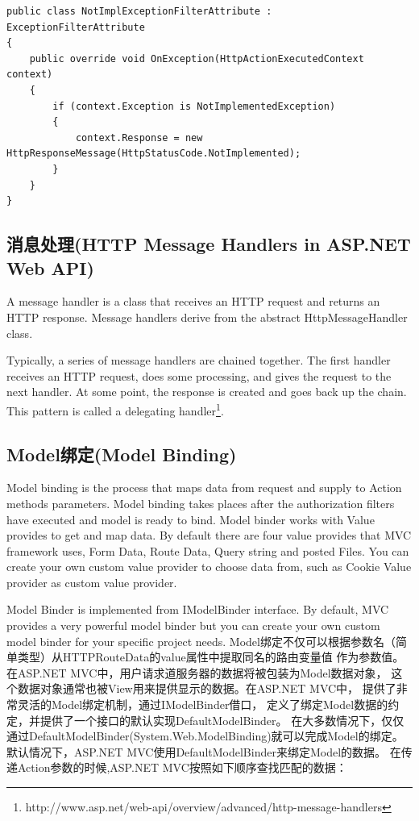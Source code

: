 \documentclass{book}
\begin{document}
\begin{lstlisting}[language={[Sharp]C},caption=Web API错误处理]
public class NotImplExceptionFilterAttribute : ExceptionFilterAttribute 
{
    public override void OnException(HttpActionExecutedContext context)
    {
        if (context.Exception is NotImplementedException)
        {
            context.Response = new HttpResponseMessage(HttpStatusCode.NotImplemented);
        }
    }
}
\end{lstlisting}

\subsection{消息处理(HTTP Message Handlers in ASP.NET Web API)}

A message handler is a class that receives an HTTP request 
and returns an HTTP response. Message handlers derive from the abstract HttpMessageHandler class.

Typically, a series of message handlers are chained together. 
The first handler receives an HTTP request, does some processing, 
and gives the request to the next handler. 
At some point, the response is created and goes back up the chain. 
This pattern is called a delegating handler\footnote{http://www.asp.net/web-api/overview/advanced/http-message-handlers}.

\subsection{Model绑定(Model Binding)}

Model binding is the process that maps data from request and supply to Action methods parameters. 
Model binding takes places after the authorization filters have executed and model is ready to bind. 
Model binder works with Value provides to get and map data. By default there 
are four value provides that MVC framework uses, Form Data, Route Data, 
Query string and posted Files. You can create your own custom value provider to choose data from, 
such as Cookie Value provider as custom value provider.

Model Binder is implemented from IModelBinder interface. 
By default, MVC provides a very powerful model binder but you can create your 
own custom model binder for your specific project needs. 
Model绑定不仅可以根据参数名（简单类型）从HTTPRouteData的value属性中提取同名的路由变量值
作为参数值。在ASP.NET MVC中，用户请求道服务器的数据将被包装为Model数据对象，
这个数据对象通常也被View用来提供显示的数据。在ASP.NET MVC中，
提供了非常灵活的Model绑定机制，通过IModelBinder借口，
定义了绑定Model数据的约定，并提供了一个接口的默认实现DefaultModelBinder。
在大多数情况下，仅仅通过DefaultModelBinder(System.Web.ModelBinding)就可以完成Model的绑定。
默认情况下，ASP.NET MVC使用DefaultModelBinder来绑定Model的数据。
在传递Action参数的时候,ASP.NET MVC按照如下顺序查找匹配的数据：
\end{document}
